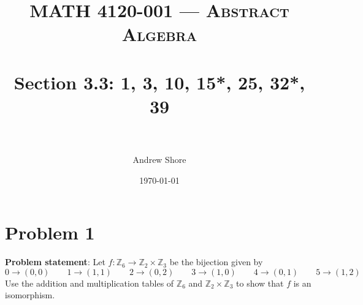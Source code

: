 \documentclass{article} %
\title{ 
\normalfont \normalsize 
\textsc{MATH 4120-001 --- Abstract Algebra} \\
\horrule{0.5pt} \\[0cm] %
\huge Section 3.3: 1, 3, 10, 15*, 25, 32*, 39  \\ %
\horrule{2pt} \\[0cm] %
}
\author{Andrew Shore} %
\date{\normalsize\today} %
\begin{document}
\maketitle %



\section*{Problem 1}

\textbf{Problem statement}: Let $f:\mathbb{Z}_6 \rightarrow \mathbb{Z}_2 \times \mathbb{Z}_3$ be the bijection given by 
\[0 \rightarrow (0,0) \qquad 1 \rightarrow (1,1) \qquad 2 \rightarrow (0,2) \qquad 3 \rightarrow (1,0) \qquad 4 \rightarrow (0,1) \qquad 5 \rightarrow (1,2)\]
Use the addition and multiplication tables of $\mathbb{Z}_6$ and $\mathbb{Z}_2 \times \mathbb{Z}_3$ to show that $f$ is an isomorphism.
\\
\end{document}
